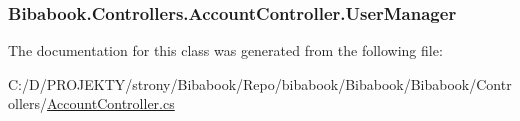 \subsubsection[{User\+Manager}]{ Bibabook.\+Controllers.\+Account\+Controller.\+User\+Manager\hspace{0.3cm}{\ttfamily [get]}}\label{class_bibabook_1_1_controllers_1_1_account_controller_a75283f080ea6dd6dfffedacaeddc31cf}


The documentation for this class was generated from the following file\+:\begin{DoxyCompactItemize}
\item 
C\+:/\+D/\+P\+R\+O\+J\+E\+K\+T\+Y/strony/\+Bibabook/\+Repo/bibabook/\+Bibabook/\+Bibabook/\+Controllers/\hyperlink{_account_controller_8cs}{Account\+Controller.\+cs}\end{DoxyCompactItemize}
